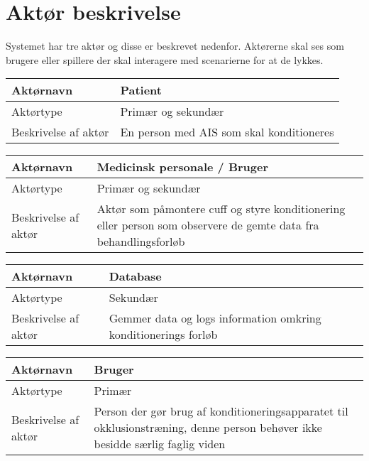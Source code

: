 	\section{Aktør beskrivelse}
	Systemet har tre aktør og disse er beskrevet nedenfor. Aktørerne skal ses som brugere eller spillere der skal interagere med scenarierne for at de lykkes. 
	
	\begin{center}
		\begin{tabular}{ | m{4cm} | m{8cm}| } 
			\hline
			Aktørnavn& Patient \\ 
			\hline
			Aktørtype & Primær og sekundær \\ 
			\hline
			Beskrivelse af aktør & En person med AIS som skal konditioneres\\ 
			\hline
		\end{tabular}
	\end{center}
	
	\begin{center}
		\begin{tabular}{ | m{4cm} | m{8cm}| } 
			\hline
			Aktørnavn& Medicinsk personale / Bruger \\ 
			\hline
			Aktørtype & Primær og sekundær \\ 
			\hline
			Beskrivelse af aktør & Aktør som påmontere cuff og styre konditionering eller person som observere de gemte data fra behandlingsforløb\\ 
			\hline
		\end{tabular}
	\end{center}
	
	\begin{center}
		\begin{tabular}{ | m{4cm} | m{8cm}| } 
			\hline
			Aktørnavn& Database \\ 
			\hline
			Aktørtype & Sekundær \\ 
			\hline
			Beskrivelse af aktør & Gemmer data og logs information omkring konditionerings forløb\\ 
			\hline
		\end{tabular}
	\end{center}
	
	\begin{center}
		\begin{tabular}{ | m{4cm} | m{8cm}| } 
			\hline
			Aktørnavn& Bruger \\ 
			\hline
			Aktørtype & Primær \\ 
			\hline
			Beskrivelse af aktør & Person der gør brug af konditioneringsapparatet til okklusionstræning, denne person behøver ikke besidde særlig faglig viden \\ 
			\hline
		\end{tabular}
	\end{center}